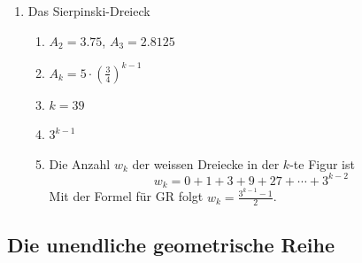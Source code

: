 \begin{enumerate}
    
    
    \item Das Sierpinski-Dreieck
    \begin{enumerate}
        \item $A_2 = 3.75$, $A_3 = 2.8125$
        \item $A_k = 5 \cdot \left( \frac{3}{4} \right)^{k-1}$
        \item $k = 39$
        \item $3^{k-1}$
        \item Die Anzahl $w_k$ der weissen Dreiecke in der $k$-te Figur ist
        $$w_k = 0 + 1 + 3 + 9 + 27 + \cdots + 3^{k-2}$$
        Mit der Formel für GR folgt $w_k = \frac{3^{k-1}-1}{2}$.
    \end{enumerate}
\end{enumerate}


















\newpage
\subsection{Die unendliche geometrische Reihe}
